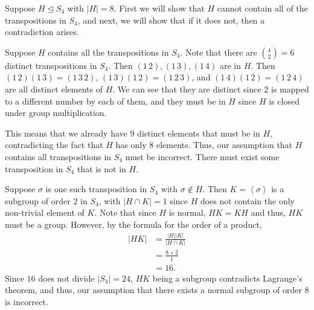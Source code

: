 \documentclass[12 pt, letterpaper]{hmcpset}
\begin{document}
\begin{solution}
	Suppose $H \trianglelefteq S_{4}$ with $\lvert H \rvert = 8$. First we will show that $H$ cannot contain all of the transpositions in $S_{4}$, and next, we will show that if it does not, then a contradiction arises. 

	Suppose $H$ contains all the transpositions in $S_{4}$. Note that there are $\binom{4}{2} = 6$ distinct transpositions in $S_{4}$. Then $(1 \, 2), (1 \, 3), (1 \, 4)$ are in $H$. Then $(1 \, 2) (1 \, 3) = (1 \, 3 \, 2)$, $(1 \, 3) (1 \, 2) = (1 \, 2 \, 3)$, and $(1 \, 4) (1 \, 2) = (1 \, 2 \, 4)$ are all distinct elements of $H$. We can see that they are distinct since $2$ is mapped to a different number by each of them, and they must be in $H$ since $H$ is closed under group multiplication. 

	This means that we already have $9$ distinct elements that must be in $H$, contradicting the fact that $H$ has only $8$ elements. Thus, our assumption that $H$ contains all transpositions in $S_{4}$ must be incorrect. There must exist some transposition in $S_{4}$ that is not in $H$. 

	Suppose $\sigma$ is one such transposition in $S_{4}$ with $\sigma \notin H$. Then $K = \left < \sigma \right >$ is a subgroup of order $2$ in $S_{4}$, with $\lvert H \cap K \rvert = 1$ since $H$ does not contain the only non-trivial element of $K$. Note that since $H$ is normal, $HK = KH$ and thus, $HK$ must be a group. However, by the formula for the order of a product,
	\[
		\begin{split}
			\lvert HK \rvert & = \frac{\lvert H \rvert \lvert K \rvert}{\lvert H \cap K \rvert} \\
					 & = \frac{8 \times 2}{1} \\
					 & = 16.
		\end{split}
	\]
	Since $16$ does not divide $\lvert S_{4} \rvert = 24$, $HK$ being a subgroup contradicts Lagrange's theorem, and thus, our assumption that there exists a normal subgroup of order $8$ is incorrect.
\end{solution}

\pagebreak
\end{document}
